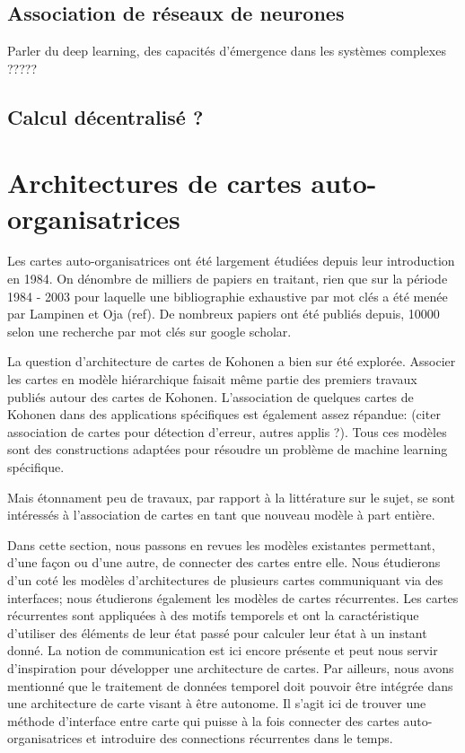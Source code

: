 \subsection{Association de réseaux de neurones}

Parler du deep learning, des capacités d'émergence dans les systèmes complexes ?????

\subsection{Calcul décentralisé ? }

\section{Architectures de cartes auto-organisatrices}
Les cartes auto-organisatrices ont été largement étudiées depuis leur introduction en 1984. On dénombre de milliers de papiers en traitant, rien que sur la période 1984 - 2003 pour laquelle une bibliographie exhaustive par mot clés a été menée par Lampinen et Oja (ref). De nombreux papiers ont été publiés depuis, 10000 selon une recherche par mot clés sur google scholar. 

La question d'architecture de cartes de Kohonen a bien sur été explorée. Associer les cartes en modèle hiérarchique faisait même partie des premiers travaux publiés autour des cartes de Kohonen.
L'association de quelques cartes de Kohonen dans des applications spécifiques est également assez répandue:
(citer association de cartes pour détection d'erreur, autres applis ?). Tous ces modèles sont des constructions adaptées pour résoudre un problème de machine learning spécifique.

Mais étonnament peu de travaux, par rapport à la littérature sur le sujet, se sont intéressés à l'association de cartes en tant que nouveau modèle à part entière.

Dans cette section, nous passons en revues les modèles existantes permettant, d'une façon ou d'une autre, de connecter des cartes entre elle. Nous étudierons d'un coté les modèles d'architectures de plusieurs cartes communiquant via des interfaces; nous étudierons également les modèles de cartes récurrentes. Les cartes récurrentes sont appliquées à des motifs temporels et ont la caractéristique d'utiliser des éléments de leur état passé pour calculer leur état à un instant donné. La notion de communication est ici encore présente et peut nous servir d'inspiration pour développer une architecture de cartes. Par ailleurs, nous avons mentionné que le traitement de données temporel doit pouvoir être intégrée dans une architecture de carte visant à être autonome. Il s'agit ici de trouver une méthode d'interface entre carte qui puisse à la fois connecter des cartes auto-organisatrices et introduire des connections récurrentes dans le temps. 

